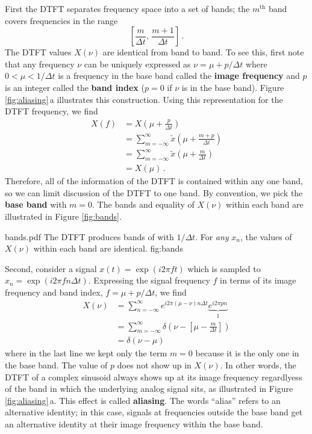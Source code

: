 \documentclass[twocolumn]{article}
\begin{document}
First the DTFT separates frequency space into a set of bands; the $m^\text{th}$ band covers frequencies in the range
\begin{equation}
\left[ \frac{m}{\Delta t}, \, \frac{m+1}{\Delta t} \right] \, . \nonumber
\end{equation}
The DTFT values $X(\nu)$ are identical from band to band.
To see this, first note that any frequency $\nu$ can be uniquely expressed as $\nu = \mu + p / \Delta t$ where \mbox{$0 < \mu < 1/\Delta t$} is a frequency in the base band called the \textbf{image frequency} and $p$ is an integer called the \textbf{band index} ($p=0$ if $\nu$ is in the base band).
Figure \ref{fig:aliasing}\,a illustrates this construction.
Using this representation for the DTFT frequency, we find
\begin{align}
X(f)
&= X \left(\mu + \frac{p}{\Delta t} \right) \nonumber \\
&= \sum_{m=-\infty}^\infty \tilde{x}	\left(\mu + \frac{m + p}{\Delta t} \right) \nonumber \\
&= \sum_{m=-\infty}^\infty \tilde{x}	\left(\mu + \frac{m}{\Delta t} \right) \nonumber \\
&= X(\mu) \, .
\end{align}
Therefore, all of the information of the DTFT is contained within any one band, so we can limit discussion of the DTFT to one band.
By convention, we pick the \textbf{base band} with $m=0$.
The bands and equality of $X(\nu)$ within each band are illustrated in Figure \ref{fig:bands}.

\quickfig{\columnwidth}
{bands.pdf}
{The DTFT produces bands of with $1/\Delta t$.
For \emph{any} $x_n$, the values of $X(\nu)$ within each band are identical.}
{fig:bands}

Second, consider a signal $x(t) = \exp(i 2 \pi f t)$ which is sampled to $x_n = \exp( i 2 \pi f n \Delta t)$.
Expressing the signal frequency $f$ in terms of its image frequency and band index, $f= \mu + p/\Delta t$, we find
\begin{align}
X(\nu)
&= \sum_{n=-\infty}^\infty e^{i 2 \pi (\mu - \nu) n \Delta t} \underbrace{e^{i 2 \pi p n}}_1 \nonumber \\
&= \sum_{m=-\infty}^\infty \delta \left(\nu - \left[ \mu - \frac{m}{\Delta t} \right] \right) \nonumber \\
&= \delta(\nu - \mu)
\end{align}
where in the last line we kept only the term $m=0$ because it is the only one in the base band.
The value of $p$ does not show up in $X(\nu)$.
In other words, the DTFT of a complex sinusoid always shows up at its image frequency regardlyess of the band in which the underlying analog signal sits, as illustrated in Figure \ref{fig:aliasing}\,a.
This effect is called \textbf{aliasing}.
The words ``alias'' refers to an alternative identity; in this case, signals at frequencies outside the base band get an alternative identity at their image frequency within the base band.
\end{document}
